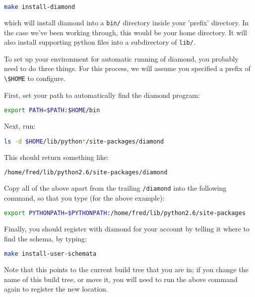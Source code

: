 \begin{lstlisting}[language=Bash]
make install-diamond
\end{lstlisting}

which will install diamond into a \lstinline[language=Bash]+bin/+ directory
inside your 'prefix' directory. In the case we've been working through, this
would be your home directory. It will also install supporting python files into
a subdirectory of \lstinline[language=Bash]+lib/+.

To set up your environment for automatic running of diamond, you probably need
to do three things. For this process, we will assume you specified a prefix of
\lstinline[language=Bash]+\$HOME+ to configure.

First, set your path to automatically find the diamond program:

\begin{lstlisting}[language=Bash]
export PATH=$PATH:$HOME/bin
\end{lstlisting}

Next, run:

\begin{lstlisting}[language=Bash]
ls -d $HOME/lib/python*/site-packages/diamond
\end{lstlisting}

This should return something like:

\begin{lstlisting}[language=Bash]
/home/fred/lib/python2.6/site-packages/diamond
\end{lstlisting}

Copy all of the above apart from the trailing
\lstinline[language=Bash]+/diamond+ into the following command, so that you
type (for the above example):

\begin{lstlisting}[language=Bash]
export PYTHONPATH=$PYTHONPATH:/home/fred/lib/python2.6/site-packages
\end{lstlisting}

Finally, you should register \fluidity with diamond for your account by
telling it where to find the \fluidity schema, by typing:

\begin{lstlisting}[language=Bash]
make install-user-schemata
\end{lstlisting}

Note that this points to the current build tree that you are in; if you change
the name of this build tree, or move it, you will need to run the above command
again to register the new location.

